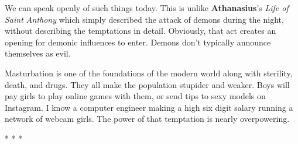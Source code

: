 We can speak openly of such things today. This is unlike \textbf{Athanasius}'s \emph{Life of Saint Anthony} which simply described the attack of demons during the night, without describing the temptations in detail. Obviously, that act creates an opening for demonic influences to enter. Demons don't typically announce themselves as evil.

Masturbation is one of the foundations of the modern world along with sterility, death, and drugs. They all make the population stupider and weaker. Boys will pay girls to play online games with them, or send tips to sexy models on Instagram. I know a computer engineer making a high six digit salary running a network of webcam girls. The power of that temptation is nearly overpowering.




\begin{center}* * *\end{center}

